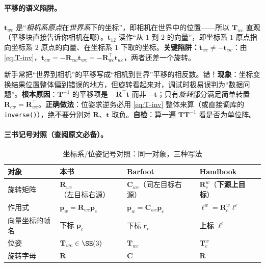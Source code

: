\paragraph{平移的语义陷阱。}$\mathbf{t}_{wc}$ 是“\emph{相机系原点}在\emph{世界系}下的坐标”，即相机在世界中的位置——所以 $\mathbf{T}_{wc}$ 直观（平移块直接告诉你相机在哪）。$\mathbf{t}_{12}$ 读作“从 $1$ 到 $2$ 的向量”，即坐标系 $1$ 原点指向坐标系 $2$ 原点的向量、在坐标系 $1$ 下取的坐标\cite{gaoxiang2019slam14}。\textbf{关键陷阱：$\mathbf{t}_{wc}\neq-\mathbf{t}_{cw}$}：由 \cref{eq:T-inv}，$\mathbf{t}_{cw}=-\mathbf{R}_{cw}\mathbf{t}_{wc}=-\mathbf{R}_{wc}^\top\mathbf{t}_{wc}$，两者还差一个旋转。

\begin{pitfall}
新手常把“世界到相机”的平移写成“相机到世界”平移的相反数。错！\textbf{现象}：坐标变换结果位置整体偏到错误的地方，但旋转看起来对，调试时极易误判为“数据问题”。\textbf{根本原因}：$\mathbf{T}^{-1}$ 的平移项是 $-\mathbf{R}^\top\mathbf{t}$ 而非 $-\mathbf{t}$；只有\emph{旋转}部分满足简单转置 $\mathbf{R}_{cw}=\mathbf{R}_{wc}^\top$。\textbf{正确做法}：位姿求逆务必用 \cref{eq:T-inv} 整体来算（或直接调库的 \texttt{inverse()}），绝不要分别对 $\mathbf{R}$、$\mathbf{t}$ 取负。\textbf{自检}：算一遍 $\mathbf{T}\mathbf{T}^{-1}$ 看是否为单位阵。
\end{pitfall}

\paragraph{三书记号对照（查阅原文必备）。}
\begin{table}[H]\centering\small
\caption{坐标系/位姿记号对照：同一对象，三种写法}
\label{tab:rb-frame-notation}
\begin{tabular}{llll}
\toprule
对象 & 本书 & Barfoot\cite{barfoot2024state} & Handbook\cite{carlone2026handbook} \\
\midrule
旋转矩阵 & $\mathbf{R}_{wc}$（左目标右源）& $\mathbf{C}_{wc}$（同左目标右源）& $\mathbf{R}_c^{w}$（\textbf{下源上目标}）\\
作用式 & $\mathbf{p}_w=\mathbf{R}_{wc}\mathbf{p}_c$ & $\mathbf{p}_w=\mathbf{C}_{wc}\mathbf{p}_c$ & $\boldsymbol{\ell}^w=\mathbf{R}_c^{w}\boldsymbol{\ell}^c$ \\
向量坐标的帧名 & 下标 $\mathbf{p}_c$ & 下标 $\mathbf{r}_c$ & \textbf{上标} $\boldsymbol{\ell}^c$ \\
位姿 & $\mathbf{T}_{wc}\in\SE(3)$ & $\mathbf{T}_{wc}$ & $\mathbf{T}_c^{w}$ \\
旋转字母 & $\mathbf{R}$ & $\mathbf{C}$ & $\mathbf{R}$ \\
\bottomrule
\end{tabular}
\end{table}

